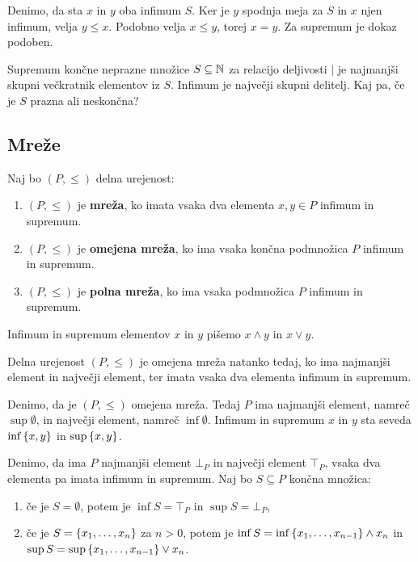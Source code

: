 \begin{dokaz}
  Denimo, da sta $x$ in $y$ oba infimum $S$. Ker je $y$ spodnja meja za
  $S$ in $x$ njen infimum, velja $y \leq x$. Podobno velja $x \leq y$, torej $x = y$. Za
  supremum je dokaz podoben.
\end{dokaz}

\begin{primer}
  Supremum končne neprazne množice $S \subseteq \mathbb{N}$ za relacijo deljivosti $\mid$
  je najmanjši skupni večkratnik elementov iz $S$. Infimum je največji skupni
  delitelj. Kaj pa, če je $S$ prazna ali neskončna?
\end{primer}

\subsection{Mreže}

\begin{definicija}
  Naj bo $(P, {\leq})$ delna urejenost:
  \begin{enumerate}
  \item $(P, \leq)$ je \textbf{mreža}, ko imata vsaka dva elementa $x, y \in P$ infimum in supremum.

  \item $(P, \leq)$ je \textbf{omejena mreža}, ko ima vsaka končna podmnožica $P$ infimum in supremum.

  \item $(P, \leq)$ je \textbf{polna mreža}, ko ima vsaka podmnožica $P$ infimum in supremum.
  \end{enumerate}
  Infimum in supremum elementov $x$ in $y$ pišemo $x \land y$ in $x \lor y$.
\end{definicija}

\begin{izrek}
  Delna urejenost $(P, {\leq})$ je omejena mreža natanko tedaj, ko ima
  najmanjši element in največji element, ter imata vsaka dva elementa infimum in supremum.
\end{izrek}

\begin{dokaz}
  Denimo, da je $(P, \leq)$ omejena mreža. Tedaj $P$ ima najmanjši element, namreč
  $\sup \emptyset$, in največji element, namreč $\inf \emptyset$. Infimum in supremum $x$ in $y$ sta seveda $\inf \left\{x, y\right\}$ in $\sup \left\{x, y\right\}$.

  Denimo, da ima $P$ najmanjši element $\bot_P$ in največji element $\top_P$, vsaka dva
  elementa pa imata infimum in supremum. Naj bo $S \subseteq P$ končna množica:
  \begin{enumerate}
  \item če je $S = \emptyset$, potem je $\inf S = \top_P$ in $\sup S = \bot_P$,
  \item če je $S = \left\{x_1, \ldots, x_n\right\}$ za $n > 0$, potem je $\inf S = \inf \left\{x_1, \ldots, x_{n-1}\right\} \land x_n$ in $\sup S = \sup \left\{x_1, \ldots, x_{n-1}\right\} \lor x_n$.
  \end{enumerate}
\end{dokaz}

